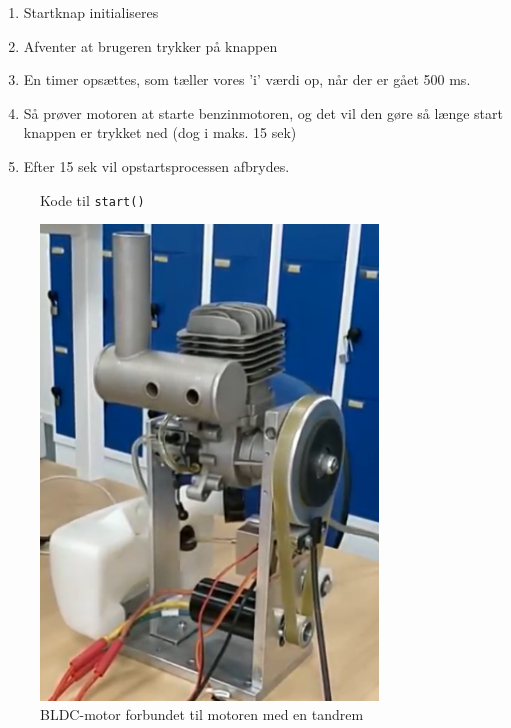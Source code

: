 \begin{enumerate}
\item Startknap initialiseres
\item Afventer at brugeren trykker på knappen
\item En timer opsættes, som tæller vores ’i’ værdi op, når der er gået 500 ms.
\item Så prøver motoren at starte benzinmotoren, og det vil den gøre så længe start knappen er trykket ned (dog i maks. 15 sek)
\item Efter 15 sek vil opstartsprocessen afbrydes.
\end{enumerate}

\begin{figure}[h]
  \centering
    
  \caption{Kode til \lstinline{start()}}
  \label{fig:kodes3}
\end{figure}

\begin{figure}[h]
  \centering
  \includegraphics[width=0.8\textwidth]{mots6.png}
  \caption{BLDC-motor forbundet til motoren med en tandrem}
  \label{fig:mots6}
\end{figure}

